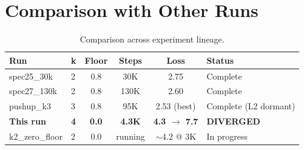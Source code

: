 \documentclass[11pt,a4paper]{article}
\begin{document}
\section{Comparison with Other Runs}

\begin{table}[h]
\centering
\begin{tabular}{llcccl}
\toprule
\textbf{Run} & \textbf{k} & \textbf{Floor} & \textbf{Steps} & \textbf{Loss} & \textbf{Status} \\
\midrule
spec25\_30k & 2 & 0.8 & 30K & 2.75 & Complete \\
spec27\_130k & 2 & 0.8 & 130K & 2.60 & Complete \\
pushup\_k3 & 3 & 0.8 & 95K & 2.53 (best) & Complete (L2 dormant) \\
\textbf{This run} & \textbf{4} & \textbf{0.0} & \textbf{4.3K} & \textbf{4.3 $\to$ 7.7} & \textcolor{failred}{\textbf{DIVERGED}} \\
k2\_zero\_floor & 2 & 0.0 & running & $\sim$4.2 @ 3K & In progress \\
\bottomrule
\end{tabular}
\caption{Comparison across experiment lineage.}
\end{table}
\end{document}
